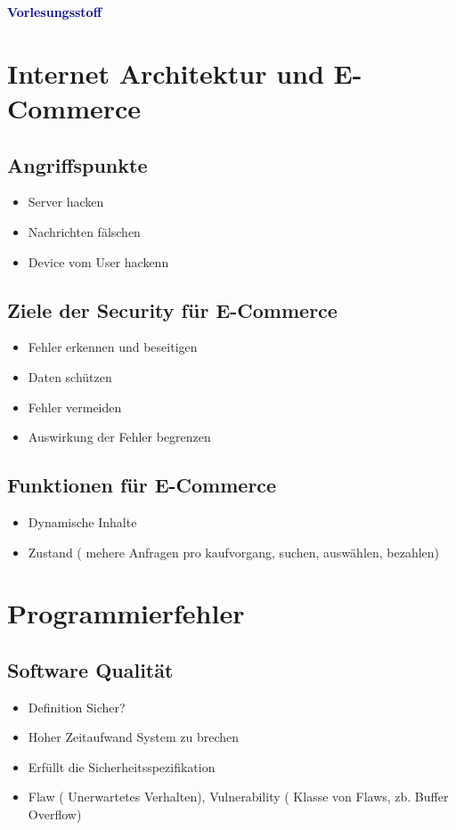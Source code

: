 \textbf{\textcolor{darkblue}{ Vorlesungsstoff}}~

\section*{Internet Architektur und E-Commerce}
\subsection*{Angriffspunkte}
\begin{itemize}
	\item 	Server hacken
	\item  Nachrichten fälschen
	\item Device vom User hackenn
\end{itemize}

\subsection*{Ziele der Security für E-Commerce}
\begin{itemize}
	\item Fehler erkennen und beseitigen
	\item Daten schützen
	\item Fehler vermeiden
	\item Auswirkung der Fehler begrenzen
\end{itemize}

\subsection*{Funktionen für E-Commerce}
\begin{itemize}
	\item 	Dynamische Inhalte
	\item  Zustand ( mehere Anfragen pro kaufvorgang, suchen, auswählen, bezahlen)
\end{itemize}


	\section*{Programmierfehler}
	
	\subsection*{Software Qualität}
	\begin{itemize}
		\item Definition Sicher?
		\item Hoher Zeitaufwand System zu brechen
		\item Erfüllt die Sicherheitsspezifikation
		\item Flaw ( Unerwartetes Verhalten), Vulnerability ( Klasse von Flaws, zb. Buffer Overflow)
	\end{itemize}

